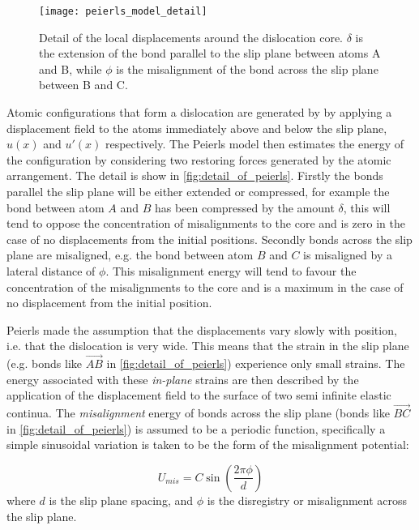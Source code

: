 \begin{figure}
\centering
\texttt{[image: peierls\_model\_detail]}
\captionsetup{width=0.7\textwidth}
\caption[Local displacements around an edge dislocation.]{Detail of the local displacements around the dislocation core. $\delta$ is the extension of the bond parallel to the slip plane between atoms A and B, while $\phi$ is the misalignment of the bond across the slip plane between B and C.\label{fig:detail_of_peierls}}
\end{figure}

Atomic configurations that form a dislocation are generated by by applying a displacement field to the atoms immediately above and below the slip plane, $u(x)$ and $u'(x)$ respectively. The Peierls model then estimates the energy of the configuration by considering two restoring forces generated by the atomic arrangement. The detail is show in \autoref{fig:detail_of_peierls}. Firstly the bonds parallel the slip plane will be either extended or compressed, for example the bond between atom $A$ and $B$ has been compressed by the amount $\delta$, this will tend to oppose the concentration of misalignments to the core and is zero in the case of no displacements from the initial positions. Secondly bonds across the slip plane are misaligned, e.g. the bond between atom $B$ and $C$ is misaligned by a lateral distance of $\phi$. This misalignment energy will tend to favour the concentration of the misalignments to the core and is a maximum in the case of no displacement from the initial position.

Peierls made the assumption that the displacements vary slowly with position, i.e. that the dislocation is very wide. This means that the strain in the slip plane (e.g. bonds like $\overrightarrow{AB}$ in \autoref{fig:detail_of_peierls}) experience only small strains. The energy associated with these \emph{in-plane} strains are then described  by the application of the displacement field to the surface of two semi infinite elastic continua. 
The \emph{misalignment} energy of bonds across the slip plane (bonds like $\overrightarrow{BC}$ in \autoref{fig:detail_of_peierls}) is assumed to be a periodic function, specifically a simple sinusoidal variation is taken to be the form of the misalignment potential:

\begin{equation}
U_{mis} = C \sin \left(\frac{2\pi \phi}{d} \right) \label{eqn:Frenkel_approx}
\end{equation}
where $d$ is the slip plane spacing, and $\phi$ is the disregistry or misalignment across the slip plane.












